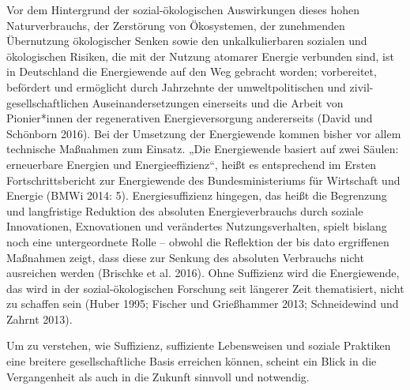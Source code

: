 \documentclass[a4paper,11pt,twoside]{scrartcl}
\begin{document}
Vor dem Hintergrund der sozial-ökologischen Auswirkungen dieses hohen Naturverbrauchs, der Zerstörung von Ökosystemen, der zunehmenden Übernutzung ökologischer Senken sowie den unkalkulierbaren sozialen und ökologischen Risiken, die mit der Nutzung atomarer Energie verbunden sind, ist in Deutschland die Energiewende auf den Weg gebracht worden; vorbereitet, befördert und ermöglicht durch Jahrzehnte der umweltpolitischen und zivil-gesellschaftlichen Auseinandersetzungen einerseits und die Arbeit von Pionier*innen der regenerativen Energieversorgung andererseits (David und Schönborn 2016). Bei der Umsetzung der Energiewende kommen bisher vor allem technische Maßnahmen zum Einsatz. „Die Energiewende basiert auf zwei Säulen: erneuerbare Energien und Energieeffizienz“, heißt es entsprechend im Ersten Fortschrittsbericht zur Energiewende des Bundesministeriums für Wirtschaft und Energie (BMWi 2014: 5). Energiesuffizienz hingegen, das heißt die Begrenzung und langfristige Reduktion des absoluten Energieverbrauchs durch soziale Innovationen, Exnovationen und verändertes Nutzungsverhalten, spielt bislang noch eine untergeordnete Rolle – obwohl die Reflektion der bis dato ergriffenen Maßnahmen zeigt, dass diese zur Senkung des absoluten Verbrauchs nicht ausreichen werden (Brischke et al. 2016). Ohne Suffizienz wird die Energiewende, das wird in der sozial-ökologischen Forschung seit längerer Zeit thematisiert, nicht zu schaffen sein (Huber 1995; Fischer und Grießhammer 2013; Schneidewind und Zahrnt 2013).

Um zu verstehen, wie Suffizienz, suffiziente Lebensweisen und soziale Praktiken eine breitere gesellschaftliche Basis erreichen können, scheint ein Blick in die Vergangenheit als auch in die Zukunft sinnvoll und notwendig.
\end{document}
